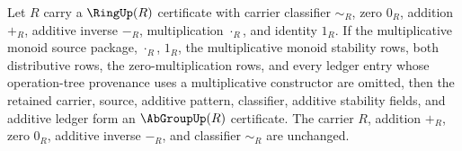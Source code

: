 \begin{proposition}
\label{prop:ring-forgets-abgroup-certificate}
Let $R$ carry a $\RingUp(R)$ certificate with carrier classifier $\sim_R$, zero $0_R$, addition $+_R$, additive inverse $-_R$, multiplication $\cdot_R$, and identity $1_R$. If the multiplicative monoid source package, $\cdot_R$, $1_R$, the multiplicative monoid stability rows, both distributive rows, the zero-multiplication rows, and every ledger entry whose operation-tree provenance uses a multiplicative constructor are omitted, then the retained carrier, source, additive pattern, classifier, additive stability fields, and additive ledger form an $\AbGroupUp(R)$ certificate. The carrier $R$, addition $+_R$, zero $0_R$, additive inverse $-_R$, and classifier $\sim_R$ are unchanged.
\end{proposition}
